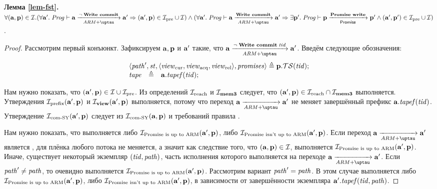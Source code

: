 \noindent
\textbf{Лемма \ref{lem-fst}.}
$\forall (\aT, \p) \in \simrel. \\
(\forall \aT'. \; \Cfprom \vdash \aT \armStepgen{\lnot \; \transenv{Write commit}} \aT' \Rightarrow (\aT', \p) \in \simrelPre \cup \simrel) \land {} \\
(\forall \aT'. \; \Cfprom \vdash \aT \armStepgen{\transenv{Write commit}} \aT' \Rightarrow
\exists \p'. \; \Cfprom \vdash \p \promStepgen{\transenv{Promise write}} \p' \land  (\aT', \p') \in \simrelPre \cup \simrel)$.
\begin{proof}
  Рассмотрим первый конъюнкт.
  Зафиксируем $\mathbf{a}, \mathbf{p}$ и $\mathbf{a}'$ такие, что $\aT \armStepgen{\lnot \; \transenv{Write commit} \; \tId} \aT'$.
  Введём следующие обозначения:
\[
\begin{array}{l l l}
\multicolumn{3}{l}{\angled{\cpath', \PromState, \angled{\Rcur, \Racq, \Rrel}, \PromSet} \triangleq \p.\TSfprom(\tId);}\\
\tape     & \triangleq & \aT.\tapef(\tId); \\
\end{array}
\]

  Нам нужно показать, что $(\mathbf{a}', \mathbf{p}) \in \mathcal{I} \cup \mathcal{I}_{\textup{\rm pre}}$.
  Из определений $\mathcal{I}_{\textup{\rm reach}}$ и $\mathcal{I}_{\rm \bf mem3}$ следует, что $(\mathbf{a}', \mathbf{p}) \in \mathcal{I}_{\textup{\rm reach}} \cap \mathcal{I}_{\rm \bf mem3}$ выполняется.
  Утверждения $\mathcal{I}_{\textup{\rm prefix}}(\mathbf{a}', \mathbf{p})$ и $\mathcal{I}_{\rm \bf view}(\mathbf{a}', \mathbf{p})$ выполняется, потому что переход $\aT \armStepgen{} \aT'$
  не меняет завершённый префикс $\mathbf{a}.\mathit{tapef}(\mathit{tid})$.
  Утверждение $\mathcal{I}_{\textup{\rm com-SY}}(\mathbf{a}', \mathbf{p})$ следует из $\mathcal{I}_{\textup{\rm com-SY}}(\mathbf{a}, \mathbf{p})$ и требований правила .
   
  Нам нужно показать, что выполняется либо $\mathcal{I}_{\textup{\rm Promise is up to ARM}}(\mathbf{a}', \mathbf{p})$, либо $\mathcal{I}_{\textup{\rm Promise isn't up to ARM}}(\mathbf{a}', \mathbf{p})$.
  Если переход $\aT \armStepgen{} \aT'$ является ,
  для плёнка любого потока не меняется, а значит как следствие того, что $(\mathbf{a}, \mathbf{p}) \in \mathcal{I}$,
  выполняется $\mathcal{I}_{\textup{\rm Promise is up to ARM}}(\mathbf{a}', \mathbf{p})$.
  Иначе, существует некоторый экземпляр $(\mathit{tid}, \mathit{path})$, часть исполнения которого выполняется на переходе $\aT \armStepgen{} \aT'$.
  Если $\mathit{path}' \not = \mathit{path}$, то очевидно выполняется $\mathcal{I}_{\textup{\rm Promise is up to ARM}}(\mathbf{a}', \mathbf{p})$.
  Рассмотрим вариант $\mathit{path}' = \mathit{path}$.
  В этом случае выполняется либо $\mathcal{I}_{\textup{\rm Promise is up to ARM}}(\mathbf{a}', \mathbf{p})$, либо $\mathcal{I}_{\textup{\rm Promise isn't up to ARM}}(\mathbf{a}', \mathbf{p})$,
  в зависимости от завершённости экземпляра $\mathbf{a}'.\mathit{tapef}(\mathit{tid}, \mathit{path})$.


\end{proof}
